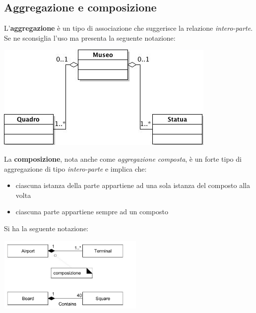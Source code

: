 \documentclass[a4paper,12pt, oneside]{book}
\begin{document}
\subsection{Aggregazione e composizione}
L'\textbf{aggregazione} è un tipo di associazione che suggerisce la relazione \textit{intero-parte}. Se ne sconsiglia l'uso ma presenta la seguente notazione:
\begin{center}
	\includegraphics[scale=2.7]{img/aggd.png}
\end{center}
La \textbf{composizione}, nota anche come \textit{aggregazione composta}, è un forte tipo di aggregazione di tipo \textit{intero-parte} e implica che:
\begin{itemize}
	\item ciascuna istanza della parte appartiene ad una sola istanza del composto alla volta
	\item ciascuna parte appartiene sempre ad un composto
\end{itemize}
Si ha la seguente notazione:
\begin{center}
	\includegraphics[scale=0.7]{img/compd.png}
\end{center}
\end{document}
